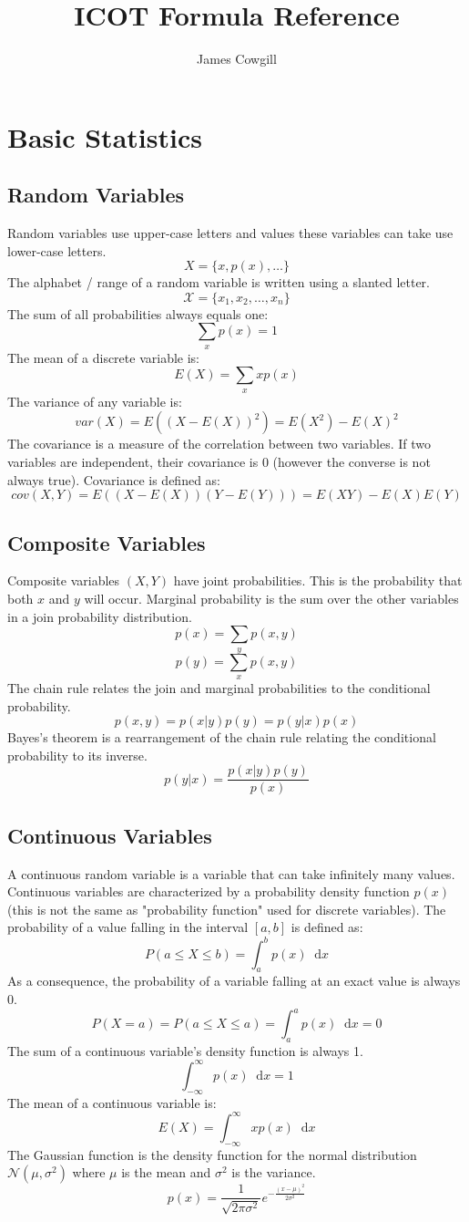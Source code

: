 \documentclass[a4paper,12pt,DIV=calc]{scrartcl}
\newcommand*{\diff}{\mathop{}\!\mathrm{d}}
\begin{document}
\title{ICOT Formula Reference}
\author{James Cowgill}
\maketitle

\section{Basic Statistics}
\subsection{Random Variables}
Random variables use upper-case letters and values these variables can take use
lower-case letters.
\[X = \{x, p(x), \dots\}\]
The alphabet / range of a random variable is written using a slanted letter.
\[\mathcal{X} = \{x_1, x_2, \dots, x_n\}\]
The sum of all probabilities always equals one:
\[\sum_x p(x) = 1\]
The mean of a discrete variable is:
\[E(X) = \sum_x x p(x)\]
The variance of any variable is:
\[var(X) = E \left ((X - E(X))^2 \right) = E \left ( X^2 \right ) - E(X)^2\]
The covariance is a measure of the correlation between two variables. If two
variables are independent, their covariance is $0$ (however the converse is not
always true). Covariance is defined as:
\[cov(X, Y) = E \left( (X - E(X))(Y - E(Y)) \right) = E(XY) - E(X)E(Y)\]

\subsection{Composite Variables}
Composite variables $(X, Y)$ have joint probabilities. This is the probability
that both $x$ and $y$ will occur. Marginal probability is the sum over the other
variables in a join probability distribution.
\[p(x) = \sum_y p(x, y)\]
\[p(y) = \sum_x p(x, y)\]
The chain rule relates the join and marginal probabilities to the conditional
probability.
\[p(x, y) = p(x|y)p(y) = p(y|x)p(x)\]
Bayes's theorem is a rearrangement of the chain rule relating the conditional
probability to its inverse.
\[p(y|x) = \frac{p(x|y)p(y)}{p(x)}\]

\subsection{Continuous Variables}
A continuous random variable is a variable that can take infinitely many values.
Continuous variables are characterized by a probability density function $p(x)$
(this is not the same as "probability function" used for discrete variables).
The probability of a value falling in the interval $[a, b]$ is defined as:
\[P(a \leq X \leq b) = \int_a^b p(x) \diff x\]
As a consequence, the probability of a variable falling at an exact value is
always 0.
\[P(X = a) = P(a \leq X \leq a) = \int_a^a p(x) \diff x = 0\]
The sum of a continuous variable's density function is always 1.
\[\int_{-\infty}^{\infty} p(x) \diff x = 1\]
The mean of a continuous variable is:
\[E(X) = \int_{-\infty}^{\infty} x p(x) \diff x\]
The Gaussian function is the density function for the normal distribution
$\mathcal{N}(\mu, \sigma^2)$ where $\mu$ is the mean and $\sigma^2$ is the
variance.
\[p(x) = \frac{1}{\sqrt{2\pi\sigma^2}}e^{-\frac{(x - \mu)^2}{2\sigma^2}}\]
\end{document}
